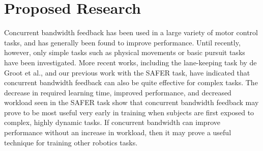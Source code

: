 \documentclass[float=false, crop=false]{standalone}
\begin{document}
\section{Proposed Research}


Concurrent bandwidth feedback has been used in a large variety of motor control tasks, and has generally been found to improve performance.
Until recently, however, only simple tasks such as physical movements or basic pursuit tasks have been investigated.
More recent works, including the lane-keeping task by de Groot et al., and our previous work with the SAFER task, have indicated that concurrent bandwidth feedback can also be quite effective for complex tasks.
The decrease in required learning time, improved performance, and decreased workload seen in the SAFER task show that concurrent bandwidth feedback may prove to be most useful very early in training when subjects are first exposed to complex, highly dynamic tasks.
If concurrent bandwidth can improve performance without an increase in workload, then it may prove a useful technique for training other robotics tasks.

\end{document}
